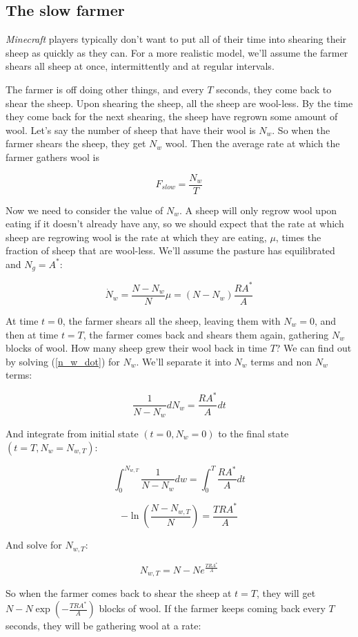 \documentclass{article}
\begin{document}
\subsection{The slow farmer}

\textit{Minecraft} players typically don't want to put all of their time into shearing their sheep as quickly as they can. For a more realistic model, we'll assume the farmer shears all sheep at once, intermittently and at regular intervals.

The farmer is off doing other things, and every $T$ seconds, they come back to shear the sheep. Upon shearing the sheep, all the sheep are wool-less. By the time they come back for the next shearing, the sheep have regrown some amount of wool. Let's say the number of sheep that have their wool is $N_w$. So when the farmer shears the sheep, they get $N_w$ wool. Then the average rate at which the farmer gathers wool is

$$F_{slow}=\frac{N_w}{T}$$

Now we need to consider the value of $N_w$. A sheep will only regrow wool upon eating if it doesn't already have any, so we should expect that the rate at which sheep are regrowing wool is the rate at which they are eating, $\mu$, times the fraction of sheep that are wool-less. We'll assume the pasture has equilibrated and $N_g=A^*$:

\begin{equation}
    \label{n_w_dot}
    \dot{N}_w=\frac{N-N_w}{N}\mu=(N-N_w)\frac{RA^*}{A}
\end{equation}


At time $t=0$, the farmer shears all the sheep, leaving them with $N_w=0$, and then at time $t=T$, the farmer comes back and shears them again, gathering $N_w$ blocks of wool. How many sheep grew their wool back in time $T$? We can find out by solving (\ref{n_w_dot}) for $N_w$. We'll separate it into $N_w$ terms and non $N_w$ terms:

$$\frac{1}{N-N_w}dN_w=\frac{RA^*}{A}dt$$

And integrate from initial state $(t=0, N_w=0)$ to the final state $(t=T, N_w=N_{w,T})$:

$$\int_{0}^{N_{w,T}}\frac{1}{N-N_w}dw=\int_{0}^{T}\frac{RA^*}{A}dt$$

$$-\ln\left(\frac{N-N_{w,T}}{N}\right)=\frac{TRA^*}{A}$$

And solve for $N_{w,T}$:

$$N_{w,T}=N-Ne^{\frac{TRA^*}{A}}$$

So when the farmer comes back to shear the sheep at $t=T$, they will get $N-N\exp\left(-\frac{TRA^*}{A}\right)$ blocks of wool. If the farmer keeps coming back every $T$ seconds, they will be gathering wool at a rate:
\end{document}
